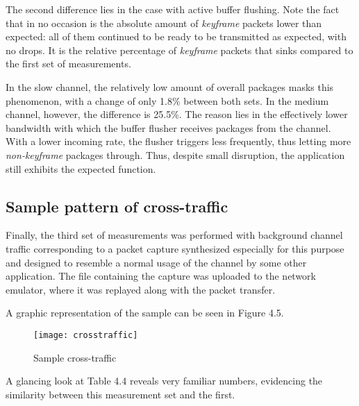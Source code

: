 The second difference lies in the case with active buffer flushing. Note the fact that in no occasion is the absolute amount of \textit{keyframe} packets lower than expected: all of them continued to be ready to be transmitted as expected, with no drops. It is the relative percentage of \textit{keyframe} packets that sinks compared to the first set of measurements.

In the slow channel, the relatively low amount of overall packages masks this phenomenon, with a change of only 1.8\% between both sets. In the medium channel, however, the difference is 25.5\%. The reason lies in the effectively lower bandwidth with which the buffer flusher receives packages from the channel. With a lower incoming rate, the flusher triggers less frequently, thus letting more \textit{non-keyframe} packages through. Thus, despite small disruption, the application still exhibits the expected function.

\clearpage

\subsection{Sample pattern of cross-traffic}

Finally, the third set of measurements was performed with background channel traffic corresponding to a packet capture synthesized especially for this purpose and designed to resemble a normal usage of the channel by some other application. The file containing the capture was uploaded to the network emulator, where it was replayed along with the packet transfer. 

A graphic representation of the sample can be seen in Figure 4.5.

\begin{figure}[!ht]
\caption{Sample cross-traffic}
\centering
\texttt{[image: crosstraffic]}
\end{figure}

A glancing look at Table 4.4 reveals very familiar numbers, evidencing the similarity between this measurement set and the first.

